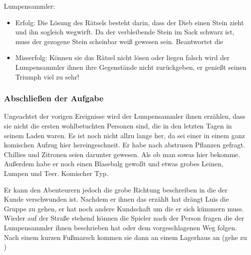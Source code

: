 Lumpensammler: 

\begin{itemize}
  \item Erfolg: Die Lösung des Rätsels besteht darin, dass der Dieb einen Stein zieht und ihn sogleich wegwirft. Da der verbleibende Stein im Sack schwarz ist, muss der gezogene Stein scheinbar weiß gewesen sein. Beantwortet die
  \item Misserfolg: Können sie das Rätsel nicht lösen oder liegen falsch wird der Lumpensammler ihnen ihre Gegenstände nicht zurückgeben, er genießt seinen Triumph viel zu sehr!
\end{itemize}

\subsubsection{Abschließen der Aufgabe}
\label{fertig}

Ungeachtet der vorigen Ereignisse wird der Lumpensammler ihnen erzählen, dass sie nicht die ersten wohlbetuchten Personen sind, die in den letzten Tagen in seinem Laden waren. Es ist noch nicht allzu lange her, da sei einer in einem ganz komischen Aufzug hier hereingeschneit. Er habe nach abstrusen Pflanzen gefragt. Chillies und Zitronen seien darunter gewesen. Als ob man sowas hier bekomme. Außerdem habe er noch einen Blasebalg gewollt und etwas grobes Leinen, Lumpen und Teer. Komischer Typ.

Er kann den Abenteurern jedoch die grobe Richtung beschreiben in die der Kunde verschwunden ist. Nachdem er ihnen das erzählt hat drängt Luis die Gruppe zu gehen, er hat noch andere Kundschaft um die er sich kümmern muss. Wieder auf der Straße stehend können die Spieler nach der Person fragen die der Lumpensammler ihnen beschrieben hat oder dem vorgeschlagenen Weg folgen. Nach einem kurzen Fußmarsch kommen sie dann an einem Lagerhaus an (gehe zu \blue{\ref{Lagerhaus}})

